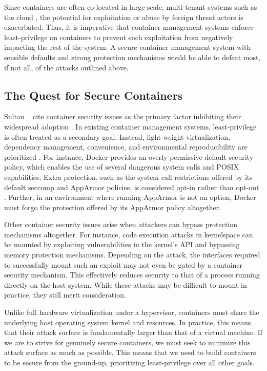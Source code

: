 Since containers are often co-located in large-scale, multi-tenant systems such as the cloud \cite{sultan2019_container_security}, the potential for exploitation or abuse by foreign threat actors is exacerbated. Thus, it is imperative that container management systems enforce least-privilege on containers to prevent such exploitation from negatively impacting the rest of the system. A secure container management system with sensible defaults and strong protection mechanisms would be able to defeat most, if not all, of the attacks outlined above.

\subsection{The Quest for Secure Containers}%
\label{sub:secure_containers}

Sultan \etal~ cite container security issues as the primary factor inhibiting their widespread adoption \cite{sultan2019_container_security}. In existing container management systems, least-privilege is often treated as a secondary goal. Instead, light-weight virtualization, dependency management, convenience, and environmental reproducibility are prioritized . For instance, Docker  \cite{docker} provides an overly permissive default security policy, which enables the use of several dangerous system calls and POSIX capabilities. Extra protection, such as the system call restrictions offered by its default seccomp and AppArmor policies, is considered opt-in rather than opt-out \cite{docker}. Further, in an environment where running AppArmor is not an option, Docker must forgo the protection offered by its AppArmor policy altogether.

Other container security issues arise when attackers can bypass protection mechanisms altogether. For instance, code execution attacks in kernelspace can be mounted by exploiting vulnerabilities in the kernel's API and bypassing memory protection mechanisms. Depending on the attack, the interfaces required to successfully mount such an exploit may not even be gated by a container security mechanism. This effectively reduces security to that of a process running directly on the host system. While these attacks may be difficult to mount in practice, they still merit consideration.

Unlike full hardware virtualization under a hypervisor, containers must share the underlying host operating system kernel and resources. In practice, this means that their attack surface is fundamentally larger than that of a virtual machine. If we are to strive for genuinely secure containers, we must seek to minimize this attack surface as much as possible. This means that we need to build containers to be secure from the ground-up, prioritizing least-privilege over all other goals.
